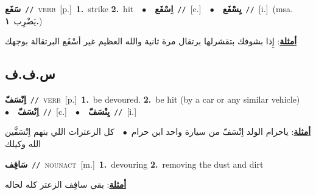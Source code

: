 \documentclass[10pt,a4paper,twoside]{article} %
\begin{document}
\begin{multicols}{2}
{\setlength\topsep{0pt}\textbf{\foreignlanguage{arabic}{سَفَع}}\ {\color{gray}\texttt{//}\color{black}}\ \textsc{verb}\ [p.]\ \textbf{1.}~strike  \textbf{2.}~hit\ \ $\bullet$\ \ \setlength\topsep{0pt}\textbf{\foreignlanguage{arabic}{اِسْفَع}}\ {\color{gray}\texttt{//}\color{black}}\ [c.]\ \ $\bullet$\ \ \setlength\topsep{0pt}\textbf{\foreignlanguage{arabic}{يِسْفَع}}\ {\color{gray}\texttt{//}\color{black}}\ [i.]\ \color{gray}(msa. \foreignlanguage{arabic}{يَضْرِب}~\foreignlanguage{arabic}{\textbf{١.}})\color{black}\  \begin{flushright}\color{gray}\foreignlanguage{arabic}{\textbf{\underline{\foreignlanguage{arabic}{أمثلة}}}: إِذا بشوفك بتقشرلها برتقال مرة ثانية والله العظيم غير أسْفَع البرتقالة بوجهك}\end{flushright}\color{black}} \vspace{2mm}

\vspace{-3mm}
\subsection*{\color{blue}\foreignlanguage{arabic}{س.ف.ف}\color{blue}{}} 

{\setlength\topsep{0pt}\textbf{\foreignlanguage{arabic}{اِنْسَفّ}}\ {\color{gray}\texttt{//}\color{black}}\ \textsc{verb}\ [p.]\ \textbf{1.}~be devoured.  \textbf{2.}~be hit (by a car or any similar vehicle)\ \ $\bullet$\ \ \setlength\topsep{0pt}\textbf{\foreignlanguage{arabic}{اِنْسَفّ}}\ {\color{gray}\texttt{//}\color{black}}\ [c.]\ \ $\bullet$\ \ \setlength\topsep{0pt}\textbf{\foreignlanguage{arabic}{يِنْسَفّ}}\ {\color{gray}\texttt{//}\color{black}}\ [i.]\  \begin{flushright}\color{gray}\foreignlanguage{arabic}{\textbf{\underline{\foreignlanguage{arabic}{أمثلة}}}: ياحرام الولد اِنْسَفّ من سيارة واحد ابن حرام\ $\bullet$\ \  كل الزعترات اللي بتهم اِنْسَفَّين الله وكيلك}\end{flushright}\color{black}} \vspace{2mm}

{\setlength\topsep{0pt}\textbf{\foreignlanguage{arabic}{سَافِف}}\ {\color{gray}\texttt{//}\color{black}}\ \textsc{noun\textunderscore act}\ [m.]\ \textbf{1.}~devouring  \textbf{2.}~removing the dust and dirt\  \begin{flushright}\color{gray}\foreignlanguage{arabic}{\textbf{\underline{\foreignlanguage{arabic}{أمثلة}}}: بقى سافِف الزعتر كله لحاله}\end{flushright}\color{black}} \vspace{2mm}


\end{multicols}
\end{document}
